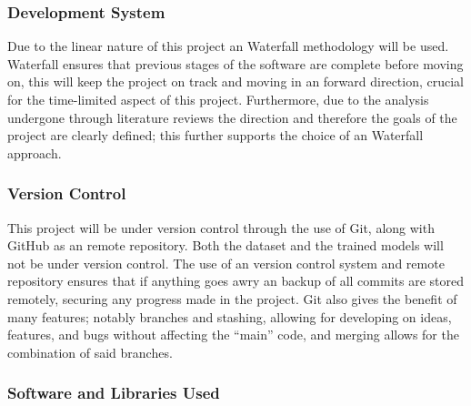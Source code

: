 \documentclass[12pt]{article}
\begin{document}
\subsubsection{Development System}

Due to the linear nature of this project an Waterfall methodology will be used. Waterfall ensures that previous stages of the software are complete before moving on, this will keep the project on track and moving in an forward direction, crucial for the time-limited aspect of this project. Furthermore, due to the analysis undergone through literature reviews the direction and therefore the goals of the project are clearly defined; this further supports the choice of an Waterfall approach. 

\subsubsection{Version Control}

This project will be under version control through the use of Git, along with GitHub as an remote repository. Both the dataset and the trained models will not be under version control. The use of an version control system and remote repository ensures that if anything goes awry an backup of all commits are stored remotely, securing any progress made in the project. Git also gives the benefit of many features; notably branches and stashing, allowing for developing on ideas, features, and bugs without affecting the ``main'' code, and merging allows for the combination of said branches. 

\subsubsection{Software and Libraries Used}
\end{document}
